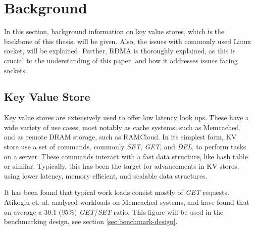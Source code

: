 
\chapter{Background}\label{ch:background} %



\ifpdf
    \graphicspath{{7/figures/PNG/}{7/figures/PDF/}{7/figures/}}
\else
    \graphicspath{{7/figures/EPS/}{7/figures/}}
\fi


%
%
In this section, background information on key value stores, which is the backbone of this thesis, will be given.
Also, the issues with commonly used Linux socket, will be explained.
Further, RDMA is thoroughly explained, as this is crucial to the understanding of this paper, and how it addresses issues facing sockets.

\section[KV-store]{Key Value Store}\label{sec:kv-store}
Key value stores are extensively used to offer low latency look ups.
These have a wide variety of use cases, most notably as cache systems, such as Memcached\cite{memcached}, and as remote DRAM storage, such as RAMCloud\cite{ousterhout2010case}.
In its simplest form, KV store use a set of commands, commonly \textit{SET}, \textit{GET}, and \textit{DEL}, to perform tasks on a server.
These commands interact with a fast data structure, like hash table or similar.
Typically, this has been the target for advancements in KV stores, using lower latency, memory efficient, and scalable data structures\cite{lim2014mica, escriva2012hyperdex}.

It has been found that typical work loads consist mostly of \textit{GET} requests.
Atikoglu et. al. analysed workloads on Memcached systems, and have found that on average a 30:1 (95\%) \textit{GET}/\textit{SET} ratio\cite{atikoglu2012workload}.
This figure will be used in the benchmarking design, see section \ref{sec:benchmark-design}.

